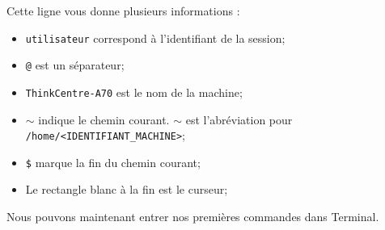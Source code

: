 \documentclass[12pt]{book}
\begin{document}
	Cette ligne vous donne plusieurs informations :
	\begin{itemize}
		\item \texttt{utilisateur} correspond à l'identifiant de la session;
		\item \texttt{@} est un séparateur;
		\item \texttt{ThinkCentre-A70} est le nom de la machine;
		\item \texttt{$\sim$} indique le chemin courant. $\sim$ est l'abréviation pour \texttt{/home/<IDENTIFIANT\_MACHINE>};
		\item \texttt{\$} marque la fin du chemin courant;
		\item Le rectangle blanc à la fin est le curseur;
	\end{itemize}\par
	Nous pouvons maintenant entrer nos premières commandes dans Terminal.
\end{document}
